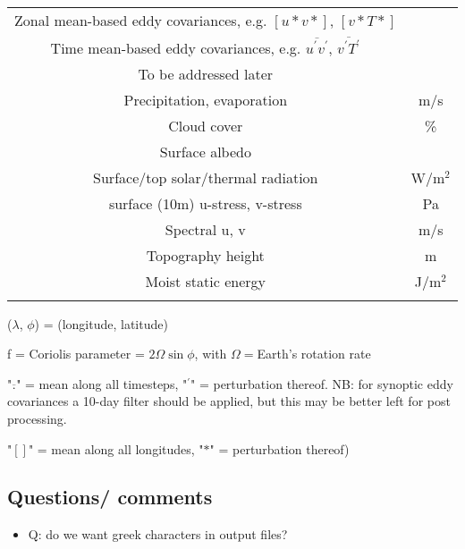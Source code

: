 \documentclass{report}
\begin{document}
\begin{center}
\begin{tabular}{ |c|c| }
 Zonal mean-based eddy covariances, e.g. $[u*v*]$, $[v*T*]$  & \\   
 Time mean-based eddy covariances, e.g. $\overline{u^{\prime}v^{\prime}}$, $\overline{v^{\prime}T^{\prime}}$  & \\ 
 \hline
 To be addressed later & \\
 \hline
 Precipitation, evaporation   & m/s \\
 Cloud cover                  & \% \\
 Surface albedo               &   \\
 Surface/top solar/thermal radiation & W/m$^2$ \\
  surface (10m) u-stress, v-stress           & Pa \\
 Spectral u, v                & m/s \\
 Topography height            & m \\
 Moist static energy        & J/m$^2$ \\  
 \\
 \hline
\end{tabular}
\end{center}
($\lambda$, $\phi$) = (longitude, latitude)

f = Coriolis parameter = $2 \Omega \sin \phi $, with $\Omega = $Earth's rotation rate

"$\overline{.}$" = mean along all timesteps, "$^{\prime}$" = perturbation thereof. NB: for synoptic eddy covariances a 10-day filter should be applied, but this may be better left for post processing.

"$[]$" = mean along all longitudes, "$*$" = perturbation thereof)


\subsection*{Questions/ comments} 

\begin{itemize}
    \item Q: do we want greek characters in output files?
\end{itemize}
\end{document}
